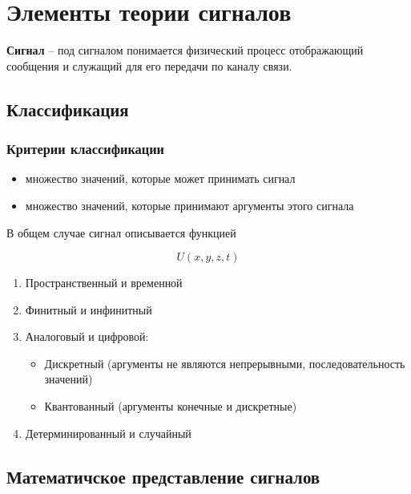 \section{Элементы теории сигналов}

\textbf{Сигнал} -- под сигналом понимается физический процесс отображающий сообщения и служащий для его передачи по каналу связи.

\subsection{Классификация}

\subsubsection{Критерии классификации}

\begin{itemize}
    \item множество значений, которые может принимать сигнал
    \item множество значений, которые принимают аргументы этого сигнала
\end{itemize}

В общем случае сигнал описывается функцией

\begin{equation*}
    U(x, y, z, t)
\end{equation*}

\begin{enumerate}
    \item Пространственный и временной
    \item Финитный и инфинитный
    \item Аналоговый и цифровой:

        \begin{itemize}
            \item Дискретный (аргументы не являются непрерывными, последовательность значений)
            \item Квантованный (аргументы конечные и дискретные)
        \end{itemize}

    \item Детерминированный и случайный
\end{enumerate}

\subsection{Математичское представление сигналов}

